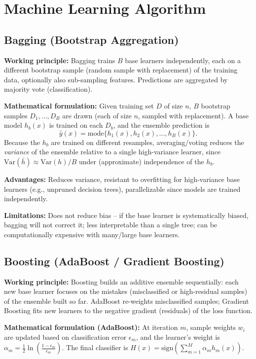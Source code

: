 \documentclass[12pt,a4paper]{article}
\begin{document}
\section{Machine Learning Algorithm}

\subsection*{Bagging (Bootstrap Aggregation)}
\textbf{Working principle:} Bagging trains $B$ base learners independently, each on a different
bootstrap sample (random sample with replacement) of the training data, optionally also
sub-sampling features. Predictions are aggregated by majority vote (classification).

\textbf{Mathematical formulation:} Given training set $D$ of size $n$, $B$ bootstrap samples
$D_1, \ldots, D_B$ are drawn (each of size $n$, sampled with replacement). A base model
$h_b(x)$ is trained on each $D_b$, and the ensemble prediction is
\[
\hat{y}(x) = \text{mode}\{h_1(x), h_2(x), \ldots, h_B(x)\}.
\]
Because the $h_b$ are trained on different resamples, averaging/voting reduces the
\emph{variance} of the ensemble relative to a single high-variance learner, since
$\text{Var}(\bar{h}) \approx \text{Var}(h)/B$ under (approximate) independence of the $h_b$.

\textbf{Advantages:} Reduces variance, resistant to overfitting for high-variance base learners
(e.g., unpruned decision trees), parallelizable since models are trained independently.

\textbf{Limitations:} Does not reduce bias -- if the base learner is systematically biased, bagging
will not correct it; less interpretable than a single tree; can be computationally expensive with
many/large base learners.

\subsection*{Boosting (AdaBoost / Gradient Boosting)}
\textbf{Working principle:} Boosting builds an additive ensemble sequentially: each new base
learner focuses on the mistakes (misclassified or high-residual samples) of the ensemble built so
far. AdaBoost re-weights misclassified samples; Gradient Boosting fits new learners to the
negative gradient (residuals) of the loss function.

\textbf{Mathematical formulation (AdaBoost):} At iteration $m$, sample weights $w_i$ are updated
based on classification error $\epsilon_m$, and the learner's weight is
$\alpha_m = \frac{1}{2}\ln\!\left(\frac{1-\epsilon_m}{\epsilon_m}\right)$. The final classifier is
$H(x) = \text{sign}\left(\sum_{m=1}^{M} \alpha_m h_m(x)\right)$.
\end{document}
